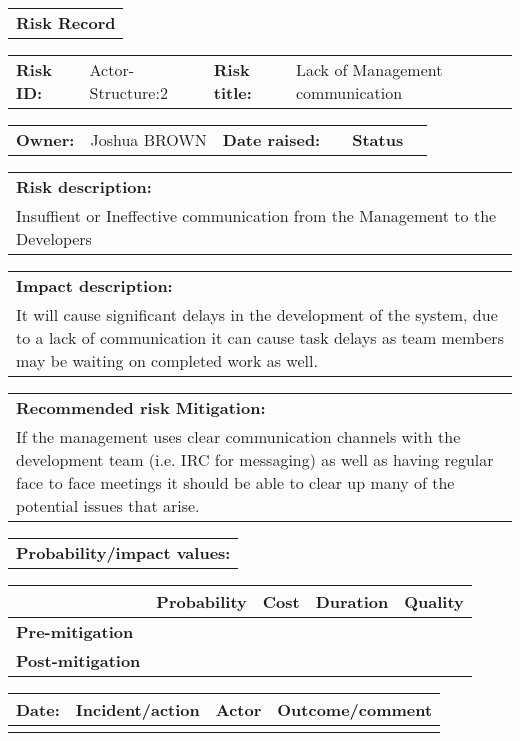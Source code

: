 \begin{table}
	\begin{tabularx}{\textwidth}{| X |}
		\hline
		\textbf{Risk Record} \\
	\end{tabularx}
	\begin{tabularx}{\textwidth}{| l | X | l | X |}
		\hline
		\textbf{Risk ID:} & Actor-Structure:2 & \textbf{Risk title:} & Lack of Management communication  \\
	\end{tabularx}
	\begin{tabularx}{\textwidth}{| l | X | l | X | l | X |}
		\hline
		\textbf{Owner:} & Joshua BROWN & \textbf{Date raised:} &  & \textbf{Status} & \\
	\end{tabularx}
	\begin{tabularx}{\textwidth}{| X |}
		\hline
		\textbf{Risk description:} \\ Insuffient or Ineffective communication from the Management to the Developers  \\
	\end{tabularx}
	\begin{tabularx}{\textwidth}{| X |}
		\hline
		\textbf{Impact description:} \\ It will cause significant delays in the development of the system, due to a lack of communication it can cause task delays as team members may be waiting on completed work as well. \\
	\end{tabularx}
	\begin{tabularx}{\textwidth}{| X |}
		\hline
		\textbf{Recommended risk Mitigation:} \\ If the management uses clear communication channels with the development team (i.e. IRC for messaging) as well as having regular face to face meetings it should be able to clear up many of the potential issues that arise.  \\
	\end{tabularx}
	\begin{tabularx}{\textwidth}{| X |}
		\hline
		\textbf{Probability/impact values:} \\
	\end{tabularx}
	\begin{tabularx}{\textwidth}{| l | l | X | X | X |}
		\hline
		 &  \textbf{Probability} & \textbf{Cost} & \textbf{Duration} & \textbf{Quality} \\ \hline
		\textbf{Pre-mitigation} & & & & \\ \hline
		\textbf{Post-mitigation} & & & & \\ \hline \hline
	\end{tabularx}
	\begin{tabularx}{\textwidth}{| l | X | l | X |}
		\hline
		\textbf{Date:} & \textbf{Incident/action} & \textbf{Actor} & \textbf{Outcome/comment} \\ \hline
		 & &  &  \\ \hline
	\end{tabularx}%
\end{table}



\FloatBarrier








